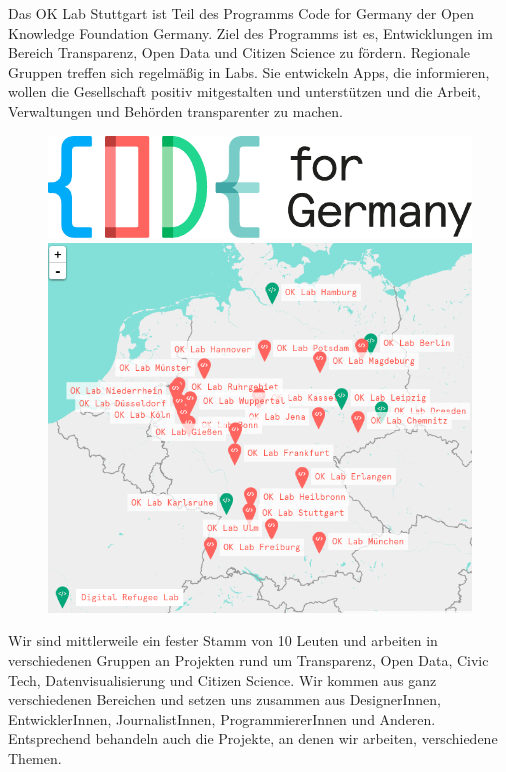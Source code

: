 \documentclass[
notumble,
]{leaflet}
\begin{document}
Das OK Lab Stuttgart ist Teil des Programms Code for Germany der Open Knowledge Foundation Germany. 
Ziel des Programms ist es, Entwicklungen im Bereich Transparenz, Open Data und Citizen Science zu fördern. 
Regionale Gruppen treffen sich regelmäßig in Labs. 
Sie entwickeln Apps, die informieren, wollen die Gesellschaft positiv mitgestalten und unterstützen und die Arbeit, Verwaltungen und Behörden transparenter zu machen.

\begin{figure}
\noindent\includegraphics[width=\textwidth]{images/CFG_logo}\\
\noindent\includegraphics[width=\textwidth]{images/codefordemap}
\end{figure}

Wir sind mittlerweile ein fester Stamm von 10 Leuten und arbeiten in verschiedenen Gruppen an Projekten rund um Transparenz, Open Data, Civic Tech, Datenvisualisierung und Citizen Science. 
Wir kommen aus ganz verschiedenen Bereichen und setzen uns zusammen aus DesignerInnen, EntwicklerInnen, JournalistInnen, ProgrammiererInnen und Anderen. 
Entsprechend behandeln auch die Projekte, an denen wir arbeiten, verschiedene Themen. 
\end{document}

